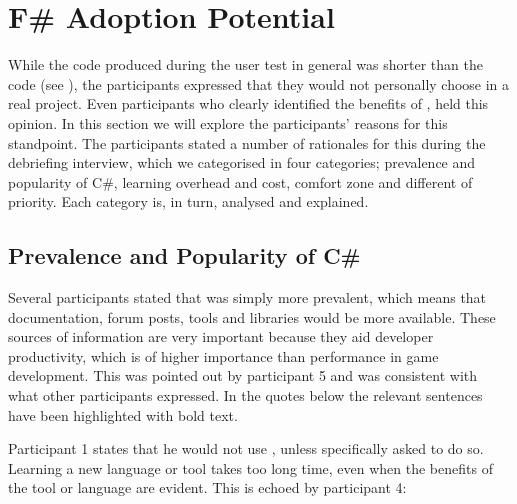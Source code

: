 \section{F\# Adoption Potential}
While the \fs code produced during the user test in general was shorter than the \cs code (see ), the participants expressed that they would not personally choose \fs in a real project. Even participants who clearly identified the benefits of \fs, held this opinion. In this section we will explore the participants' reasons for this standpoint. The participants stated a number of rationales for this during the debriefing interview, which we categorised in four categories; prevalence and popularity of C\#, learning overhead and cost, comfort zone and different of priority. Each category is, in turn, analysed and explained.

\subsection{Prevalence and Popularity of C\#}
Several participants stated that \cs was simply more prevalent, which means that documentation, forum posts, tools and libraries would be more available. These sources of information are very important because they aid developer productivity, which is of higher importance than performance in game development. This was pointed out by participant 5 and was consistent with what other participants expressed. In the quotes below the relevant sentences have been highlighted with bold text.


Participant 1 states that he would not use \fs, unless specifically asked to do so. Learning a new language or tool takes too long time, even when the benefits of the tool or language are evident. This is echoed by participant 4:



